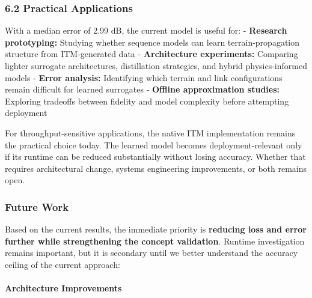 \documentclass[
]{article}
\begin{document}
\subsubsection{6.2 Practical Applications}\label{practical-applications}

With a median error of 2.99 dB, the current model is useful for: -
\textbf{Research prototyping:} Studying whether sequence models can
learn terrain-propagation structure from ITM-generated data -
\textbf{Architecture experiments:} Comparing lighter surrogate
architectures, distillation strategies, and hybrid physics-informed
models - \textbf{Error analysis:} Identifying which terrain and link
configurations remain difficult for learned surrogates - \textbf{Offline
approximation studies:} Exploring tradeoffs between fidelity and model
complexity before attempting deployment

For throughput-sensitive applications, the native ITM implementation
remains the practical choice today. The learned model becomes
deployment-relevant only if its runtime can be reduced substantially
without losing accuracy. Whether that requires architectural change,
systems engineering improvements, or both remains open.

\subsubsection{Future Work}\label{future-work}

Based on the current results, the immediate priority is \textbf{reducing
loss and error further while strengthening the concept validation}.
Runtime investigation remains important, but it is secondary until we
better understand the accuracy ceiling of the current approach:

\paragraph{Architecture Improvements}\label{architecture-improvements}
\end{document}
